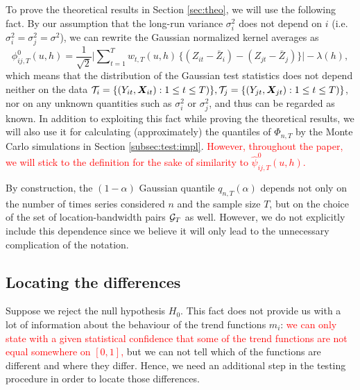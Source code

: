 \documentclass[a4paper,12pt]{article}
\makeatletter
\renewcommand{\eqref}[1]{\tagform@{\ref{#1}}}
\makeatother
\begin{document}
\begin{remark}
To prove the theoretical results in Section \ref{sec:theo}, we will use the following fact. By our assumption that the long-run variance $\sigma_i^2$ does not depend on $i$ \linebreak (i.e. $\sigma_i^2 = \sigma^2_j = \sigma^2$), we can rewrite the Gaussian normalized kernel averages \eqref{eq:phi_zero_ij} as
\[\phi^0_{ij,T}(u, h) = \frac{1}{\sqrt{2}} \Big|\sum\nolimits_{t=1}^T w_{t,T}(u,h) \, \big\{ (Z_{it} - \bar{Z}_i) - (Z_{jt} - \bar{Z}_j) \big\}\Big| - \lambda(h), \] 
which means that the distribution of the Gaussian test statistics does not depend neither on the data $\mathcal{T}_i =\{ (Y_{it}, \boldsymbol{X}_{it}) : 1\leq t \leq T)\}, \mathcal{T}_j =\{ (Y_{jt}, \boldsymbol{X}_{jt}) : 1\leq t \leq T)\}$, nor on any unknown quantities such as $\sigma^2_i$ or $\sigma_j^2$, and thus can be regarded as known. In addition to exploiting this fact while proving the theoretical results, we will also use it for calculating (approximately) the quantiles of $\Phi_{n, T}$ by the Monte Carlo simulations in Section \ref{subsec:test:impl}. \textcolor{red}{However, throughout the paper, we will stick to the definition \eqref{eq:phi_zero_ij} for the sake of similarity to $\hat{\psi}^0_{ij,T}(u, h)$.}%
\end{remark}

\begin{remark}
By construction, the $(1-\alpha)$ Gaussian quantile $q_{n, T}(\alpha)$ depends not only on the number of times series considered $n$ and the sample size $T$, but on the choice of the set of location-bandwidth pairs $\mathcal{G}_T$ as well. However, we do not explicitly include this dependence since we believe it will only lead to the unnecessary complication of the notation. 
\end{remark}

\subsection{Locating the differences}\label{subsec:test:loc}

Suppose we reject the null hypothesis $H_0$. This fact does not provide us with a lot of information about the behaviour of the trend functions $m_i$: \textcolor{red}{we can only state with a given statistical confidence that some of the trend functions are not equal somewhere on $[0, 1]$,} but we can not tell which of the functions are different and where they differ. Hence, we need an additional step in the testing procedure in order to locate those differences.
\end{document}

